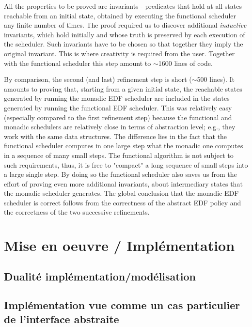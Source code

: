 	All the properties to be proved are invariants - predicates that hold at all states reachable from an initial state, obtained by executing the functional scheduler any finite number of times. The proof required us to discover additional \emph{inductive} invariants, which hold initially and whose truth is preserved by each execution of the scheduler. Such invariants have to be chosen so that together they imply the original invariant. This is where creativity is required from the user. Together with the functional scheduler this step amount to $\sim$1600 lines of code.

	By comparison, the second (and last) refinement step is short ($\sim$500 lines). It amounts to proving that, starting from a given initial state, the reachable states generated by running the monadic EDF scheduler are included in the states generated by running the functional EDF scheduler. This was relatively easy (especially compared to the first refinement step) because the functional and monadic schedulers are relatively close in terms of abstraction level; e.g., they work with the same data structures. The difference lies in the fact that the functional scheduler computes in one large step what the monadic one computes in a sequence of many small steps.  The functional algorithm is not subject to such requirements, thus, it is free to "compact" a long sequence of small steps into a large single step. By doing so the functional scheduler also saves us from the effort of proving even more additional invariants, about intermediary states that the monadic scheduler generates.  
\indent The global conclusion that the monadic EDF scheduler is correct follows from the correctness of the abstract EDF policy and the correctness of the two successive refinements.

	\section{Mise en oeuvre / Implémentation}
		\subsection{Dualité implémentation/modélisation}
		
		\subsection{Implémentation vue comme un cas particulier de l'interface abstraite}
	\label{sec:monad}

